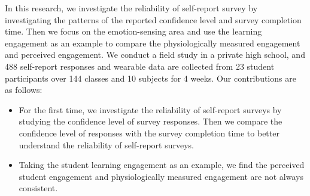 \documentclass[sigconf]{acmart}
\begin{document}
In this research, we investigate the reliability of self-report survey by investigating the patterns of the reported confidence level and survey completion time. Then we focus on the emotion-sensing area and use the learning engagement as an example to compare the physiologically measured engagement and perceived engagement. We conduct a field study in a private high school, and 488 self-report responses and wearable data are collected from 23 student participants over 144 classes and 10 subjects for 4 weeks. 
Our contributions are as follows:
\begin{itemize}
    \item For the first time, we investigate the reliability of self-report surveys by studying the confidence level of survey responses. Then we  compare the confidence level of responses with the survey completion time to better understand the reliability of self-report surveys.
    
     \item Taking the student learning engagement as an example, we find the perceived student engagement and physiologically measured engagement are not always consistent.%
     

\end{itemize}
\end{document}
